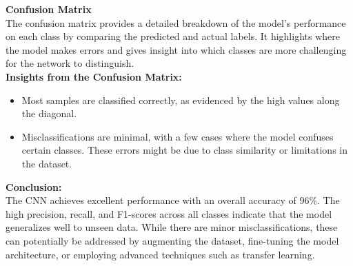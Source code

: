 \documentclass{modeleRapport}
\begin{document}
\textbf{Confusion Matrix}\\

The confusion matrix provides a detailed breakdown of the model's performance on each class by comparing the predicted and 
actual labels. It highlights where the model makes errors and gives insight into which classes are more challenging for the 
network to distinguish.\\

\textbf{Insights from the Confusion Matrix:}\\
\begin{itemize}
    \item Most samples are classified correctly, as evidenced by the high values along the diagonal.
    \item Misclassifications are minimal, with a few cases where the model confuses certain classes. 
    These errors might be due to class similarity or limitations in the dataset.\\
\end{itemize}

\textbf{Conclusion:}\\

The CNN achieves excellent performance with an overall accuracy of 96\%. The high precision, recall, 
and F1-scores across all classes indicate that the model generalizes well to unseen data. While there are minor 
misclassifications, these can potentially be addressed by augmenting the dataset, fine-tuning the model architecture, 
or employing advanced techniques such as transfer learning.



\insererbiblio
\end{document}
